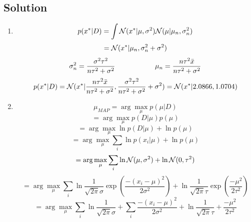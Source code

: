 \documentclass[submit]{harvardml}
\begin{document}
\subsection*{Solution}
 \begin{enumerate}
     \item 
     \begin{equation*}
         p(x^*|D) = \int \mathcal{N}(x^*|\mu, \sigma^2) \mathcal{N}(\mu | \mu_{n}, \sigma_{n}^2)
     \end{equation*}
     \begin{equation*}
         = \mathcal{N}(x^* | \mu_{n}, \sigma_{n}^2 + \sigma^2)
     \end{equation*}
     \begin{equation*}
         \sigma_{n}^2 = \frac{\sigma^2\tau^2}{n\tau^2 + \sigma^2} \hspace{2cm} \mu_{n} = \frac{n\tau^2\Bar{x}}{n\tau^2 + \sigma^2}
     \end{equation*}
     \begin{equation*}
         p(x^*|D) = \mathcal{N}(x^* | \frac{n\tau^2\Bar{x}}{n\tau^2 + \sigma^2}, \frac{\sigma^2\tau^2}{n\tau^2 + \sigma^2} + \sigma^2) = \mathcal{N}(x^* | 2.0866, 1.0704)
     \end{equation*}
     \item
     \begin{equation*}
     \mu_{MAP} = \arg\max_{\mu} p(\mu|D)
     \end{equation*}
     \begin{equation*}
     = \arg\max_{\mu} p(D|\mu) p(\mu)
     \end{equation*}
     \begin{equation*}
     = \arg\max_{\mu} \ln p(D|\mu)  + \ln p(\mu)
     \end{equation*}
     \begin{equation*}
     = \arg\max_{\mu} \sum_{i} \ln p(x_i|\mu)  + \ln p(\mu)
     \end{equation*}
     \begin{equation*}
     = \arg\max_{\mu} \sum_{i} \ln \mathcal{N}(\mu, \sigma^2)  + \ln \mathcal{N}(0, \tau^2)
     \end{equation*}
     \begin{equation*}
     = \arg\max_{\mu} \sum_{i} \ln \frac{1}{\sqrt{2\pi}\sigma}\exp(\frac{-(x_i -\mu)^2}{2\sigma^2})  + \ln \frac{1}{\sqrt{2\pi}\tau} \exp(\frac{-\mu^2}{2\tau^2})
     \end{equation*}
     \begin{equation*}
     = \arg\max_{\mu} \sum_{i} \ln \frac{1}{\sqrt{2\pi}\sigma} + \sum_{i} \frac{-(x_i -\mu)^2}{2\sigma^2}  + \ln \frac{1}{\sqrt{2\pi}\tau} + \frac{-\mu^2}{2\tau^2}

\end{equation*}
\end{enumerate}
\end{document}
